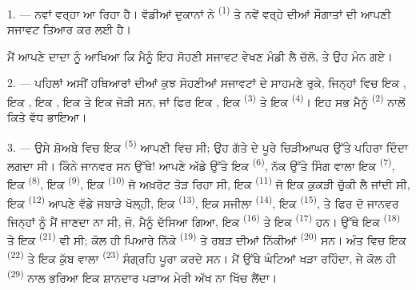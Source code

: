 %

\VUsaut{4.0mm}
\VUsaut{2.0mm}
\VUsaut{3.4mm}

1. --- ਨਵਾਂ ਵਰ੍ਹਾ ਆ ਰਿਹਾ ਹੈ। ਵੱਡੀਆਂ ਦੁਕਾਨਾਂ ਨੇ 
\textsuperscript{(1)} ਤੇ ਨਵੇਂ ਵਰ੍ਹੇ ਦੀਆਂ ਸੌਗਾਤਾਂ ਦੀ ਆਪਣੀ ਸਜਾਵਟ ਤਿਆਰ ਕਰ ਲਈ ਹੈ।

ਮੈਂ ਆਪਣੇ ਦਾਦਾ ਨੂੰ ਆਖਿਆ ਕਿ ਮੈਨੂੰ ਇਹ ਸੋਹਣੀ ਸਜਾਵਟ ਵੇਖਣ ਮੰਡੀ ਲੈ ਚੱਲੋ, ਤੇ ਉਹ ਮੰਨ ਗਏ।

2. --- ਪਹਿਲਾਂ ਅਸੀਂ ਹਥਿਆਰਾਂ ਦੀਆਂ ਕੁਝ ਸੋਹਣੀਆਂ ਸਜਾਵਟਾਂ ਦੇ ਸਾਹਮਣੇ ਰੁਕੇ, ਜਿਨ੍ਹਾਂ ਵਿਚ ਇਕ
, ਇਕ , ਇਕ , ਇਕ
 ਤੇ ਇਕ ਜੋੜੀ  ਸਨ, ਜਾਂ ਫਿਰ ਇਕ
, ਇਕ  \textsuperscript{(3)} ਤੇ ਇਕ
 \textsuperscript{(4)}। ਇਹ ਸਭ ਮੈਨੂੰ 
\textsuperscript{(2)} ਨਾਲੋਂ ਕਿਤੇ ਵੱਧ ਭਾਇਆ।

\VUsaut{3.0mm}
\VUsaut{2.6mm}

3. --- ਉਸੇ ਸ਼ੋਅਬੇ ਵਿਚ ਇਕ  \textsuperscript{(5)} ਆਪਣੀ
 ਵਿਚ ਸੀ; ਉਹ ਗੱਤੇ ਦੇ ਪੂਰੇ ਚਿੜੀਆਘਰ ਉੱਤੇ ਪਹਿਰਾ ਦਿੰਦਾ ਲਗਦਾ ਸੀ।
ਕਿੰਨੇ ਜਾਨਵਰ ਸਨ ਉੱਥੇ! ਆਪਣੇ ਅੱਡੇ ਉੱਤੇ ਇਕ  \textsuperscript{(6)}, ਨੱਕ
ਉੱਤੇ ਸਿੰਗ ਵਾਲਾ ਇਕ  \textsuperscript{(7)}, ਇਕ 
\textsuperscript{(8)}, ਇਕ  \textsuperscript{(9)}, ਇਕ
 \textsuperscript{(10)} ਜੋ ਅਖ਼ਰੋਟ ਤੋੜ ਰਿਹਾ ਸੀ, ਇਕ 
\textsuperscript{(11)} ਜੋ ਇਕ ਕੁਕੜੀ ਚੁੱਕੀ ਲੈ ਜਾਂਦੀ ਸੀ, ਇਕ 
\textsuperscript{(12)} ਆਪਣੇ ਵੱਡੇ ਜਬਾੜੇ ਖੋਲ੍ਹੀ, ਇਕ 
\textsuperscript{(13)}, ਇਕ ਸਜੀਲਾ  \textsuperscript{(14)}, ਇਕ
 \textsuperscript{(15)}, ਤੇ ਫਿਰ ਦੋ ਜਾਨਵਰ ਜਿਨ੍ਹਾਂ ਨੂੰ ਮੈਂ ਜਾਣਦਾ ਨਾ ਸੀ,
ਜੋ, ਮੈਨੂੰ ਦੱਸਿਆ ਗਿਆ, ਇਕ  \textsuperscript{(16)} ਤੇ ਇਕ
 \textsuperscript{(17)} ਹਨ। ਉੱਥੇ ਇਕ 
\textsuperscript{(18)} ਤੇ ਇਕ  \textsuperscript{(21)} ਵੀ ਸੀ; ਕੋਲ ਹੀ
ਪਿਆਰੇ ਨਿੱਕੇ  \textsuperscript{(19)} ਤੇ ਰਬੜ ਦੀਆਂ ਨਿੱਕੀਆਂ
 \textsuperscript{(20)} ਸਨ। ਅੰਤ ਵਿਚ ਇਕ 
\textsuperscript{(22)} ਤੇ ਇਕ ਕੁੱਬ ਵਾਲਾ  \textsuperscript{(23)} ਸੰਗ੍ਰਹਿ
ਪੂਰਾ ਕਰਦੇ ਸਨ। ਮੈਂ ਉੱਥੇ ਘੰਟਿਆਂ ਖੜਾ ਰਹਿੰਦਾ, ਜੇ ਕੋਲ ਹੀ 
\textsuperscript{(29)} ਨਾਲ ਭਰਿਆ ਇਕ ਸ਼ਾਨਦਾਰ ਪੜਾਅ ਮੇਰੀ ਅੱਖ ਨਾ ਖਿੱਚ ਲੈਂਦਾ।

